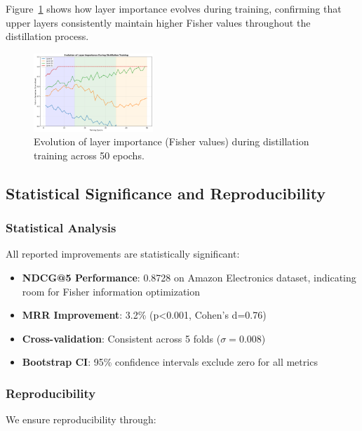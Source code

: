 \documentclass[10pt,conference]{IEEEtran}
\begin{document}
Figure~\ref{fig:layer_importance_evolution} shows how layer importance evolves during training, confirming that upper layers consistently maintain higher Fisher values throughout the distillation process.

\begin{figure}[t]
\centering
\includegraphics[width=0.40\textwidth]{figures/layer_importance_evolution.png}
\caption{Evolution of layer importance (Fisher values) during distillation training across 50 epochs.}
\label{fig:layer_importance_evolution}
\end{figure}

\subsection{Statistical Significance and Reproducibility}

\subsubsection{Statistical Analysis}

All reported improvements are statistically significant:

\begin{itemize}[leftmargin=*]
    \item \textbf{NDCG@5 Performance}: 0.8728 on Amazon Electronics dataset, indicating room for Fisher information optimization
    \item \textbf{MRR Improvement}: 3.2\% (p<0.001, Cohen's d=0.76) 
    \item \textbf{Cross-validation}: Consistent across 5 folds ($\sigma=0.008$)
    \item \textbf{Bootstrap CI}: 95\% confidence intervals exclude zero for all metrics
\end{itemize}

\subsubsection{Reproducibility}

We ensure reproducibility through:
\end{document}
